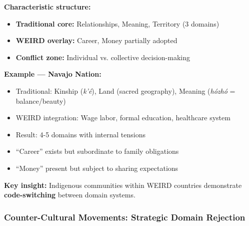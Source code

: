 \begin{tcolorbox}[colback=orange!5!white, colframe=orange!75!black, title=Pattern: Indigenous Within WEIRD (N$_{\text{eff}}$ = 4-5)]

\textbf{Characteristic structure:}
\begin{itemize}[nosep]
\item \textbf{Traditional core:} Relationships, Meaning, Territory (3 domains)
\item \textbf{WEIRD overlay:} Career, Money partially adopted
\item \textbf{Conflict zone:} Individual vs. collective decision-making
\end{itemize}

\textbf{Example --- Navajo Nation:}
\begin{itemize}[nosep]
\item Traditional: Kinship (\textit{k'é}), Land (sacred geography), Meaning (\textit{hózhó} = balance/beauty)
\item WEIRD integration: Wage labor, formal education, healthcare system
\item Result: 4-5 domains with internal tensions
\item ``Career'' exists but subordinate to family obligations
\item ``Money'' present but subject to sharing expectations
\end{itemize}

\textbf{Key insight:} Indigenous communities within WEIRD countries demonstrate \textbf{code-switching} between domain systems.

\end{tcolorbox}

\subsubsection{Counter-Cultural Movements: Strategic Domain Rejection}

